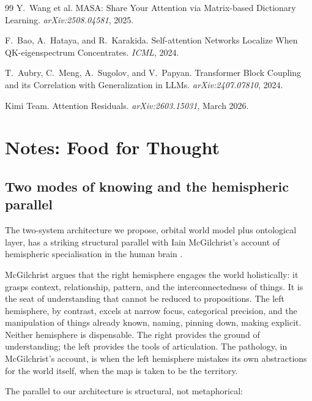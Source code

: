 \documentclass[11pt, a4paper]{article}
\theoremstyle{remark}
\begin{document}
\begin{thebibliography}{99}
Y.~Wang et al.
MASA: Share Your Attention via Matrix-based Dictionary Learning.
\emph{arXiv:2508.04581}, 2025.

F.~Bao, A.~Hataya, and R.~Karakida.
Self-attention Networks Localize When QK-eigenspectrum Concentrates.
\emph{ICML}, 2024.

T.~Aubry, C.~Meng, A.~Sugolov, and V.~Papyan.
Transformer Block Coupling and its Correlation with Generalization in LLMs.
\emph{arXiv:2407.07810}, 2024.

Kimi Team.
Attention Residuals.
\emph{arXiv:2603.15031}, March 2026.

\end{thebibliography}

\appendix
\section*{Notes: Food for Thought}

\subsection*{Two modes of knowing and the hemispheric parallel}

The two-system architecture we propose, orbital world model plus ontological layer, has a striking structural parallel with Iain McGilchrist's account of hemispheric specialisation in the human brain \cite{mcgilchrist2009master, mcgilchrist2021matter}.

McGilchrist argues that the right hemisphere engages the world holistically: it grasps context, relationship, pattern, and the interconnectedness of things.
It is the seat of understanding that cannot be reduced to propositions.
The left hemisphere, by contrast, excels at narrow focus, categorical precision, and the manipulation of things already known, naming, pinning down, making explicit.
Neither hemisphere is dispensable.
The right provides the ground of understanding; the left provides the tools of articulation.
The pathology, in McGilchrist's account, is when the left hemisphere mistakes its own abstractions for the world itself, when the map is taken to be the territory.

The parallel to our architecture is structural, not metaphorical:
\end{document}
